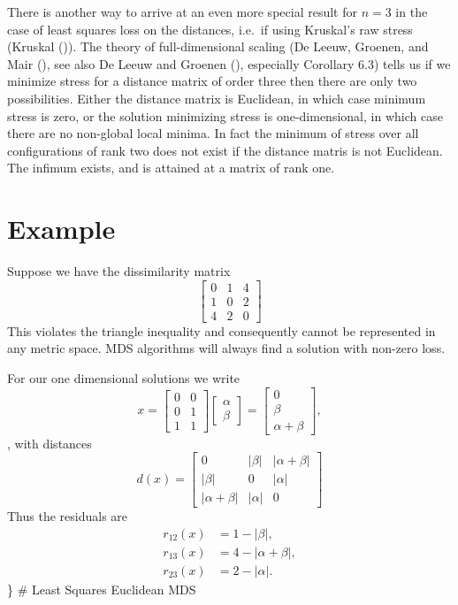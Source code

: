 \documentclass[
  12pt,
  letterpaper,
  DIV=11,
  numbers=noendperiod]{scrartcl}
\begin{document}
There is another way to arrive at an even more special result for
\(n=3\) in the case of least squares loss on the distances, i.e.~if
using Kruskal's raw stress (Kruskal ()).
The theory of full-dimensional scaling (De Leeuw, Groenen, and Mair
(), see also De Leeuw and
Groenen (), especially
Corollary 6.3) tells us if we minimize stress for a distance matrix of
order three then there are only two possibilities. Either the distance
matrix is Euclidean, in which case minimum stress is zero, or the
solution minimizing stress is one-dimensional, in which case there are
no non-global local minima. In fact the minimum of stress over all
configurations of rank two does not exist if the distance matris is not
Euclidean. The infimum exists, and is attained at a matrix of rank one.

\section{Example}\label{example}

Suppose we have the dissimilarity matrix \[
\begin{bmatrix}
0&1&4\\
1&0&2\\
4&2&0
\end{bmatrix}
\] This violates the triangle inequality and consequently cannot be
represented in any metric space. MDS algorithms will always find a
solution with non-zero loss.

For our one dimensional solutions we write \[
x=\begin{bmatrix}
0&0\\
0&1\\
1&1
\end{bmatrix}
\begin{bmatrix}
\alpha\\
\beta
\end{bmatrix}
=
\begin{bmatrix}
0\\
\beta\\
\alpha+\beta
\end{bmatrix},
\], with distances \[
d(x)=\begin{bmatrix}
0&|\beta|&|\alpha+\beta|\\
|\beta|&0&|\alpha|\\
|\alpha+\beta|&|\alpha|&0
\end{bmatrix}
\] Thus the residuals are \begin{align}
r_{12}(x)&=1-|\beta|,\\
r_{13}(x)&=4-|\alpha+\beta|,\\
r_{23}(x)&=2-|\alpha|.
\end{align} \} \# Least Squares Euclidean MDS
\end{document}
